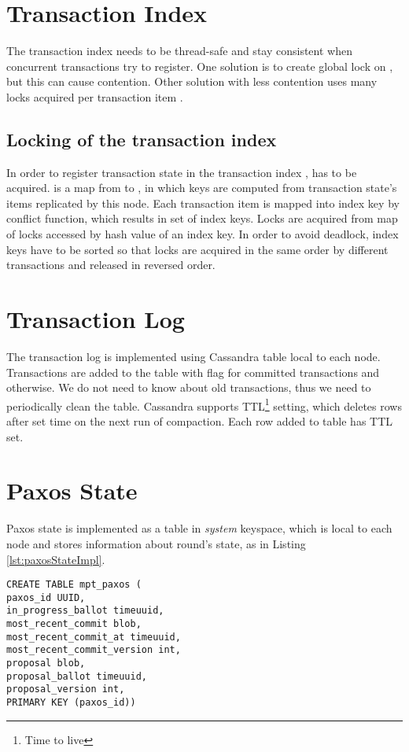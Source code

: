 \section{Transaction Index}
The transaction index \txIndex needs to be thread-safe and stay consistent when concurrent transactions try to register. One solution is to create global lock on \txIndex, but this can cause contention. Other solution with less contention uses many locks acquired per transaction item \txItem.

\subsection{Locking of the transaction index}
In order to register transaction state \txState in the transaction index \txIndex, \txIndex has to be acquired.
\txIndex is a map from  to , in which keys are computed from transaction
state’s items replicated by this node. Each transaction item \txItem is mapped into index key by conflict function,
which results in set of index keys. Locks are acquired from map of locks accessed by hash value of an index key. In
order to avoid deadlock, index keys have to be sorted so that locks are acquired in the same order by different
transactions and released in reversed order.



\section{Transaction Log}
The transaction log \txLog is implemented using Cassandra table local to each node. 
Transactions are added to the table with flag  for committed transactions and  otherwise. We do not need to know about old transactions, thus we need to periodically clean the table. Cassandra supports TTL\footnote{Time to live} setting, which deletes rows after set time on the next run of compaction. Each row added to \txLog table has TTL set.


\section{Paxos State}
Paxos state is implemented as a table in \emph{system} keyspace, which is local to each node and stores information about \paxos round's state, as in Listing \ref{lst:paxosStateImpl}.

\begin{lstlisting}[style=outcode,label={lst:paxosStateImpl},caption={Table definition for multi partition transactions Paxos state}]
CREATE TABLE mpt_paxos (
paxos_id UUID,
in_progress_ballot timeuuid,
most_recent_commit blob,
most_recent_commit_at timeuuid,
most_recent_commit_version int,
proposal blob,
proposal_ballot timeuuid,
proposal_version int,
PRIMARY KEY (paxos_id))
\end{lstlisting}



